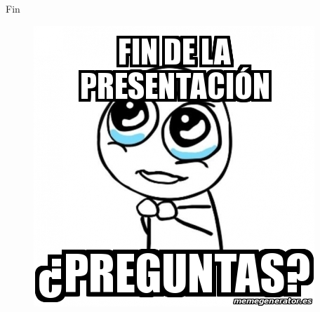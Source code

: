 \documentclass[10pt]{beamer}
\begin{document}
\begin{frame}{Fin}
\begin{figure}[h]
  \centering
  \includegraphics[width=0.78\linewidth]{fin}
\end{figure}
\end{frame}
\end{document}
